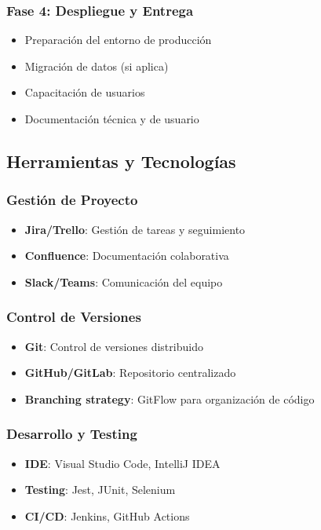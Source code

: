 \subsubsection{Fase 4: Despliegue y Entrega}
\begin{itemize}
    \item Preparación del entorno de producción
    \item Migración de datos (si aplica)
    \item Capacitación de usuarios
    \item Documentación técnica y de usuario
\end{itemize}

\subsection{Herramientas y Tecnologías}

\subsubsection{Gestión de Proyecto}
\begin{itemize}
    \item \textbf{Jira/Trello}: Gestión de tareas y seguimiento
    \item \textbf{Confluence}: Documentación colaborativa
    \item \textbf{Slack/Teams}: Comunicación del equipo
\end{itemize}

\subsubsection{Control de Versiones}
\begin{itemize}
    \item \textbf{Git}: Control de versiones distribuido
    \item \textbf{GitHub/GitLab}: Repositorio centralizado
    \item \textbf{Branching strategy}: GitFlow para organización de código
\end{itemize}

\subsubsection{Desarrollo y Testing}
\begin{itemize}
    \item \textbf{IDE}: Visual Studio Code, IntelliJ IDEA
    \item \textbf{Testing}: Jest, JUnit, Selenium
    \item \textbf{CI/CD}: Jenkins, GitHub Actions
\end{itemize}

